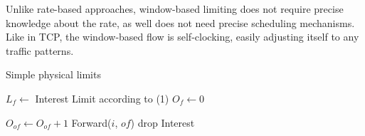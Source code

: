 Unlike rate-based approaches, window-based limiting does not require precise knowledge about the rate, as well does not need precise scheduling mechanisms.
Like in TCP, the window-based flow is self-clocking, easily adjusting itself to any traffic patterns.

\begin{algorithm}[h]
\caption{Simple physical limits}
\label{alg:simple limits}
\begin{algorithmic}[1]
    \State $L_{f} \leftarrow$ Interest Limit according to (1)
    \State $O_{f} \leftarrow 0$ 
\EndFor

\vspace{0.2cm}
     
        \State $O_{of} \leftarrow O_{of} + 1$
        \State Forward($i$, $of$)
    \Else
        \State drop Interest
    \EndIf
\EndFor
\EndFunction

\vspace{0.2cm}

\end{algorithmic}
\end{algorithm}


